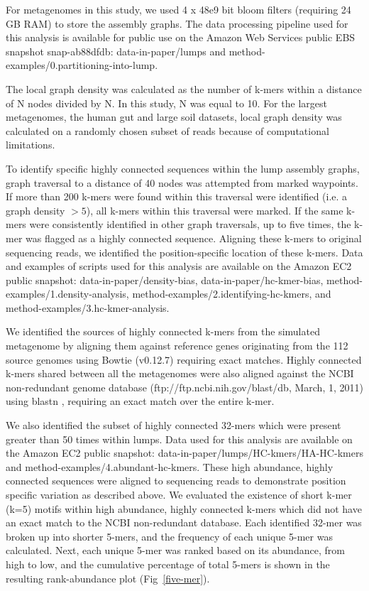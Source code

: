\documentclass[10pt]{article}
\begin{document}
For metagenomes in this study, we used 4 x 48e9 bit bloom
filters (requiring 24 GB RAM) to store the assembly graphs.  The data processing
pipeline used for this analysis is available for public use on the Amazon Web Services public EBS snapshot snap-ab88dfdb: data-in-paper/lumps and
method-examples/0.partitioning-into-lump.


The local graph density was calculated as the number of
k-mers within a distance of N nodes divided by N. In this
study, N was equal to 10.  For the largest metagenomes, the human gut
and large soil datasets, local graph density was calculated on a
randomly chosen subset of reads because of computational limitations.

To identify specific highly connected sequences within the lump
assembly graphs, graph traversal to a distance of 40 nodes was
attempted from marked waypoints.  If more than 200 k-mers were found
within this traversal were identified (i.e. a graph density $> 5$), all
k-mers within this traversal were marked. If the same k-mers were consistently identified
in other graph traversals, up to five times, the k-mer was flagged as
a highly connected sequence.  Aligning these k-mers to original
sequencing reads, we identified the position-specific location of
these k-mers.  Data and examples of scripts used for this analysis are
available on the Amazon EC2 public snapshot:
data-in-paper/density-bias, data-in-paper/hc-kmer-bias,
method-examples/1.density-analysis,
method-examples/2.identifying-hc-kmers, and
method-examples/3.hc-kmer-analysis.

We identified the sources of highly connected k-mers from the
simulated metagenome by aligning them against reference genes
originating from the 112 source genomes using Bowtie (v0.12.7)
requiring exact matches.  Highly connected k-mers shared between all
the metagenomes were also aligned against the NCBI non-redundant
genome database (ftp://ftp.ncbi.nih.gov/blast/db, March, 1, 2011)
using blastn \cite{Altschul:1990p1335}, requiring an exact match over
the entire k-mer.

We also identified the subset of highly connected 32-mers which were
present greater than 50 times within lumps. Data used for this
analysis are available on the Amazon EC2 public snapshot:
data-in-paper/lumps/HC-kmers/HA-HC-kmers and
method-examples/4.abundant-hc-kmers. These high abundance, highly
connected sequences were aligned to sequencing reads to demonstrate
position specific variation as described above.  We evaluated the
existence of short k-mer (k=5) motifs within high abundance, highly
connected k-mers which did not have an exact match to the NCBI
non-redundant database.  Each identified 32-mer was broken up into
shorter 5-mers, and the frequency of each unique 5-mer was calculated.
Next, each unique 5-mer was ranked based on its abundance, from high
to low, and the cumulative percentage of total 5-mers is shown in the
resulting rank-abundance plot (Fig~\ref{five-mer}).
  
\end{document}
